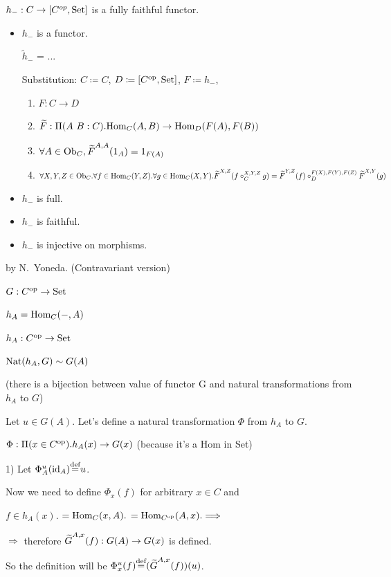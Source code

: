 \documentclass[10pt,a4paper]{article}
\begin{document}
\myqed
\begin{Lemma}
$h_{-}:C\rightarrow [C^{op},{\textrm{Set}}]$ is a fully faithful functor.
\end{Lemma}
\myprf
\begin{itemize}
\item $h_-$ is a functor.

$\widetilde{h}_-$ = ...

Substitution: $C\coloneqq C$, $D\coloneqq [C^{\textrm{op}},{\textrm{Set}}]$, $F\coloneqq h_-$,
\begin{enumerate}
\item $F:C \to D$
\item ${\widetilde{F}\textrm{}}:\Pi(A\ B:C).{\textrm{Hom}}_C(A,B) \to {\textrm{Hom}}_D(F(A), F(B))$
\item $\forall A\in {\textrm{Ob}}_C, {\widetilde{F}\textrm{}}^{A,A}(1_A)=1_{F(A)}$
\item $\forall X,Y,Z \in {\textrm{Ob}}_C.\forall f\in{\textrm{Hom}}_C(Y,Z).\forall g\in{\textrm{Hom}}_C(X,Y). {\widetilde{F}\textrm{}}^{X,Z}(f\circ_C^{X,Y,Z} g)={\widetilde{F}\textrm{}}^{Y,Z}(f)\circ_D^{F(X),F(Y),F(Z)} {\widetilde{F}\textrm{}}^{X,Y}(g)$
\end{enumerate}
\item $h_-$ is full.
\item $h_-$ is faithful.
\item $h_-$ is injective on morphisms.
\end{itemize}
\myqed
\begin{Lemma}{by N.~Yoneda. (Contravariant version)}

$G : C^{\textrm{op}} \to {\textrm{Set}}$

$h_A = {\textrm{Hom}}_C(-,A)$

$h_A : C^{\textrm{op}} \to {\textrm{Set}}$

${\textrm{Nat}}(h_A,G)\sim G(A)$

(there is a bijection between value of functor G and natural transformations from $h_A$ to $G$)
\end{Lemma}
\myprf

Let $u\in G(A)$. Let's define a natural transformation $\Phi$ from $h_A$ to $G$.

$\Phi:\Pi(x\in C^{\textrm{op}}).h_A(x)\to G(x)$ (because it's a Hom in Set)

1) Let $\Phi^u_A({\textrm{id}}_A){\stackrel{{\textrm{def}}}{=}} u$. 

Now we need to define $\Phi_x(f)$ for arbitrary $x\in C$ and

$f\in h_A(x).$ $={\textrm{Hom}}_C(x,A).$ $={\textrm{Hom}}_{C^{\textrm{op}}}(A,x). \Longrightarrow$

$\Longrightarrow$ therefore ${\widetilde{G}\textrm{}} ^{A,x}(f):G(A)\to G(x)$ is defined.

So the definition will be $\Phi^u_x(f){\stackrel{{\textrm{def}}}{=}} ({\widetilde{G}\textrm{}}^{A,x}(f))(u)$.
\end{document}
